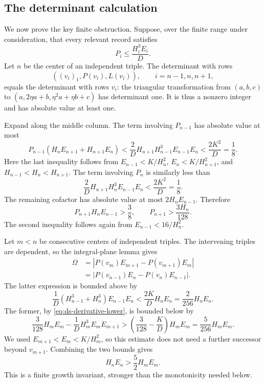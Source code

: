 \subsection{The determinant calculation}

We now prove the key finite obstruction.  Suppose, over the finite range
under consideration, that every relevant record satisfies
\begin{equation}\label{eq:ds-small-derivative}
 P_i\leq\frac{H_i^3E_i}{D}.
\end{equation}
Let $n$ be the center of an independent triple.  The determinant with
rows
\[
 ((v_i)_1,P(v_i),L(v_i)),\qquad i=n-1,n,n+1,
\]
equals the determinant with rows $v_i$: the triangular transformation
from $(a,b,c)$ to $(a,2\eta a+b,\eta^2a+\eta b+c)$ has determinant one.
It is thus a nonzero integer and has absolute value at least one.

Expand along the middle column.  The term involving $P_{n-1}$ has absolute
value at most
\[
 P_{n-1}(H_nE_{n+1}+H_{n+1}E_n)
 <\frac{2}{D}H_{n+1}H_{n-1}^3E_{n-1}E_n
 <\frac{2K^2}{D}=\frac18.
\]
Here the last inequality follows from
$E_{n-1}<K/H_n^2$, $E_n<K/H_{n+1}^2$, and
$H_{n-1}<H_n<H_{n+1}$.  The term involving $P_n$ is similarly less than
\[
 \frac{2}{D}H_{n+1}H_n^3E_{n-1}E_n
 <\frac{2K^2}{D}=\frac18.
\]
The remaining cofactor has absolute value at most $2H_nE_{n-1}$.
Therefore
\begin{equation}\label{eq:ds-derivative-lower}
 P_{n+1}H_nE_{n-1}>\frac38,
 \qquad P_{n+1}>\frac{3H_n}{128}.
\end{equation}
The second inequality follows again from $E_{n-1}<16/H_n^2$.

Let $m<n$ be consecutive centers of independent triples.  The intervening
triples are dependent, so the integral-plane lemma gives
\begin{align*}
 \Omega&=|P(v_m)E_{m+1}-P(v_{m+1})E_m|\\
  &=|P(v_{n-1})E_n-P(v_n)E_{n-1}|.
\end{align*}
The latter expression is bounded above by
\[
 \frac1D(H_{n-1}^3+H_n^3)E_{n-1}E_n
 <\frac{2K}{D}H_nE_n=\frac{2}{256}H_nE_n.
\]
The former, by \eqref{eq:ds-derivative-lower}, is bounded below by
\[
 \frac{3}{128}H_mE_m-\frac1D H_m^3E_mE_{m+1}
 >\left(\frac{3}{128}-\frac{K}{D}\right)H_mE_m
 =\frac{5}{256}H_mE_m.
\]
We used $E_{m+1}<E_m<K/H_m^2$, so this estimate does not need a further
successor beyond $v_{m+1}$.  Combining the two bounds gives
\begin{equation}\label{eq:ds-growth}
 H_nE_n>\frac52 H_mE_m.
\end{equation}
This is a finite growth invariant, stronger than the monotonicity needed
below.

